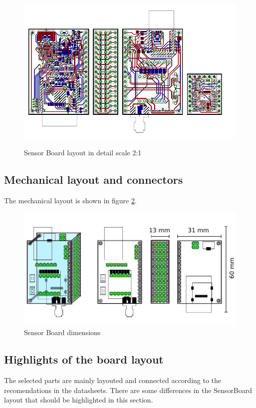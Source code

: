 \begin{figure}
	\centering
	\includegraphics[angle=90, scale=2]{img/brd.pdf}
	\label{brd2}
	\caption{Sensor Board layout in detail scale 2:1}
\end{figure}

\subsection{Mechanical layout and connectors}
The mechanical layout is shown in figure \ref{fig:HWdimensions}.

\begin{figure}
	\centering
	\label{fig:HWdimensions}
	\caption{Sensor Board dimensions}
	\includegraphics[scale=1]{img/HWdimensions.pdf}
\end{figure}

\subsection{Highlights of the board layout}
The selected parts are mainly layouted and connected according to the recomendations in the datasheets. There are some differences in the SensorBoard layout that should be highlighted in this section.

